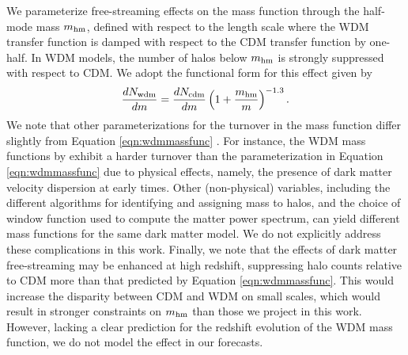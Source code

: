 We parameterize free-streaming effects on the mass function through the half-mode mass $m_{\rm{hm}}$, defined with respect to the length scale where the WDM transfer function is damped with respect to the CDM transfer function by one-half. In WDM models, the number of halos below $m_{\rm{hm}}$ is strongly suppressed with respect to CDM. We adopt the functional form for this effect given by \citet{Lovell++14}
\begin{equation}
\label{eqn:wdmmassfunc}
\frac{dN_{\rm{wdm}}}{dm} = \frac{dN_{\rm{cdm}}}{dm} \left(1+\frac{m_{\rm{hm}}}{m}\right)^{-1.3}.
\end{equation}
We note that other parameterizations for the turnover in the mass function differ slightly from Equation \ref{eqn:wdmmassfunc} \citep[see ][]{Schneider++12,Benson++13}. For instance, the WDM mass functions by \citet{Benson++13} exhibit a harder turnover than the parameterization in Equation \ref{eqn:wdmmassfunc} due to physical effects, namely, the presence of dark matter velocity dispersion at early times. Other (non-physical) variables, including the different algorithms for identifying and assigning mass to halos, and the choice of window function used to compute the matter power spectrum, can yield different mass functions for the same dark matter model. We do not explicitly address these complications in this work. Finally, we note that the effects of dark matter free-streaming may be enhanced at high redshift, suppressing halo counts relative to CDM more than that predicted by Equation \ref{eqn:wdmmassfunc}. This would increase the disparity between CDM and WDM on small scales, which would result in stronger constraints on ${m_{\rm{hm}}}$ than those we project in this work. However, lacking a clear prediction for the redshift evolution of the WDM mass function, we do not model the effect in our forecasts. 


